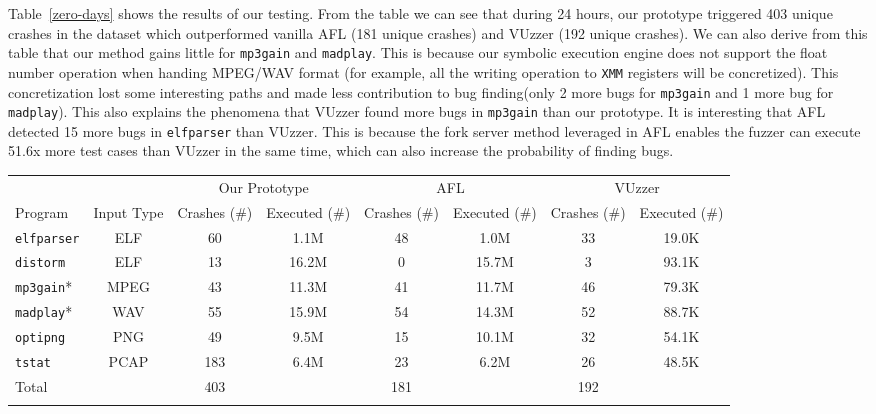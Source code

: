 Table~\ref{zero-days} shows the results of our testing. 
From the table we can see that during 24 hours, our prototype triggered 403 unique crashes in the dataset which outperformed vanilla AFL (181 unique crashes) and VUzzer (192 unique crashes). 
We can also derive from this table that our method gains little for \texttt{mp3gain} and \texttt{madplay}. This is because our symbolic execution engine does not support the float number operation when handing MPEG/WAV format (for example, all the writing operation to \texttt{XMM} registers will be concretized). This concretization lost some interesting paths and made less contribution to bug finding(only 2 more bugs for \texttt{mp3gain} and 1 more bug for \texttt{madplay}). 
This also explains the phenomena that VUzzer found more bugs in \texttt{mp3gain} than our prototype. 
It is interesting that AFL detected 15 more bugs in \texttt{elfparser} than VUzzer. This is because the fork server method leveraged in AFL enables the fuzzer can execute 51.6x more test cases than VUzzer in the same time, which can also increase the probability of finding bugs.

\begin{table}[!t]
{\begin{tabular}{lccccccc}\toprule
	& & \multicolumn{2}{c}{Our Prototype} & \multicolumn{2}{c}{AFL} & \multicolumn{2}{c}{VUzzer}\\
		    Program & Input Type & Crashes (\#) & Executed (\#)& Crashes (\#) & Executed  (\#) & Crashes (\#) & Executed (\#) \\
\midrule
\texttt{elfparser}  & ELF	& 60 &   1.1M & 48   & 1.0M   & 33 & 19.0K    \\
		\texttt{distorm}    & ELF    & 13 &   16.2M   & 0   & 15.7M    & 3 & 93.1K    \\
		\texttt{mp3gain}*   & MPEG	& 43 &   11.3M  & 41  &  11.7M   & 46 &  79.3K  \\
		\texttt{madplay}*   & WAV	& 55 &   15.9M  & 54  & 14.3M    & 52 & 88.7K   \\
		\texttt{optipng}    & PNG    & 49 &   9.5M & 15  &  10.1M   & 32 & 54.1K   \\
		\texttt{tstat}      & PCAP   & 183&   6.4M & 23 &  6.2M   & 26 & 48.5K   \\
		\midrule
		Total      &        & 403   &  & 181 &  & 192 &\\
\botrule
\end{tabular}}{}
\end{table}

